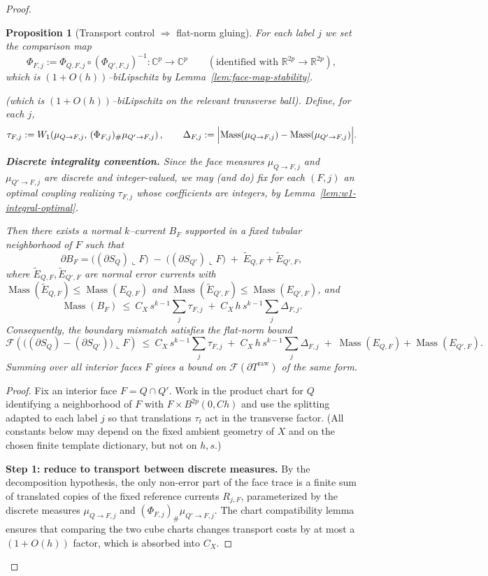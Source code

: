 \documentclass[11pt]{article}
\numberwithin{equation}{section}  %
\theoremstyle{plain}
\newtheorem{proposition}[theorem]{Proposition}
\theoremstyle{definition}
\theoremstyle{remark}
\newcommand{\R}{\mathbb{R}}
\newcommand{\C}{\mathbb{C}}
\DeclareMathOperator{\Mass}{Mass}
\begin{document}
\begin{proof}
\begin{proposition}[Transport control $\Rightarrow$ flat-norm gluing]
For each label $j$ we set the comparison map
\[
\Phi_{F,j}:=\Phi_{Q,F,j}\circ(\Phi_{Q',F,j})^{-1}\colon \C^p\to \C^p
\qquad(\text{identified with }\R^{2p}\to\R^{2p}),
\]
which is $(1+O(h))$--biLipschitz by Lemma~\ref{lem:face-map-stability}.


(which is $(1+O(h))$--biLipschitz on the relevant transverse ball).  Define, for each $j$,
\[
\tau_{F,j}:=W_1\!\left(\mu_{Q\to F,j},\,(\Phi_{F,j})_\#\mu_{Q'\to F,j}\right),
\qquad
\Delta_{F,j}:=\Bigl|\Mass(\mu_{Q\to F,j})-\Mass(\mu_{Q'\to F,j})\Bigr|.
\]

%
\noindent\textbf{Discrete integrality convention.}
Since the face measures $\mu_{Q\to F,j}$ and $\mu_{Q'\to F,j}$ are discrete and integer-valued,
we may (and do) fix for each $(F,j)$ an \emph{optimal} coupling realizing $\tau_{F,j}$ whose coefficients are integers,
by Lemma~\ref{lem:w1-integral-optimal}.


Then there exists a normal $k$--current $B_F$ supported in a fixed tubular neighborhood of $F$ such that
\[
\partial B_F
=\bigl((\partial S_Q)\llcorner F\bigr)\;-\;\bigl((\partial S_{Q'})\llcorner F\bigr)\;+\;\widetilde E_{Q,F}+\widetilde E_{Q',F},
\]
where $\widetilde E_{Q,F},\widetilde E_{Q',F}$ are normal error currents with
$\Mass(\widetilde E_{Q,F})\le \Mass(E_{Q,F})$ and $\Mass(\widetilde E_{Q',F})\le \Mass(E_{Q',F})$, and
\[
\Mass(B_F)\ \le\ C_X\,s^{k-1}\sum_j \tau_{F,j}\;+\;C_X\,h\,s^{k-1}\sum_j \Delta_{F,j}.
\]
Consequently, the boundary mismatch satisfies the flat-norm bound
\[
\mathcal F\!\left(\bigl((\partial S_Q)-(\partial S_{Q'})\bigr)\llcorner F\right)
\ \le\ C_X\,s^{k-1}\sum_j \tau_{F,j}\;+\;C_X\,h\,s^{k-1}\sum_j \Delta_{F,j}
\;+\; \Mass(E_{Q,F})+\Mass(E_{Q',F}).
\]
Summing over all interior faces $F$ gives a bound on $\mathcal F(\partial T^{\mathrm{raw}})$ of the same form.
\end{proposition}


\begin{proof}
Fix an interior face $F=Q\cap Q'$.
Work in the product chart for $Q$ identifying a neighborhood of $F$ with
$F\times B^{2p}(0,C h)$ and use the splitting adapted to each label $j$ so that translations $\tau_t$ act in the
transverse factor.  (All constants below may depend on the fixed ambient geometry of $X$ and on the chosen finite
template dictionary, but not on $h,s$.)

\smallskip\noindent
\textbf{Step 1: reduce to transport between discrete measures.}
By the decomposition hypothesis, the only non-error part of the face trace is a finite sum of translated copies
of the fixed reference currents $R_{j,F}$, parameterized by the discrete measures $\mu_{Q\to F,j}$ and
$(\Phi_{F,j})_\#\mu_{Q'\to F,j}$.  The chart compatibility lemma ensures that comparing the two cube charts changes
transport costs by at most a $(1+O(h))$ factor, which is absorbed into $C_X$.


\end{proof}
\end{proof}
\end{document}

